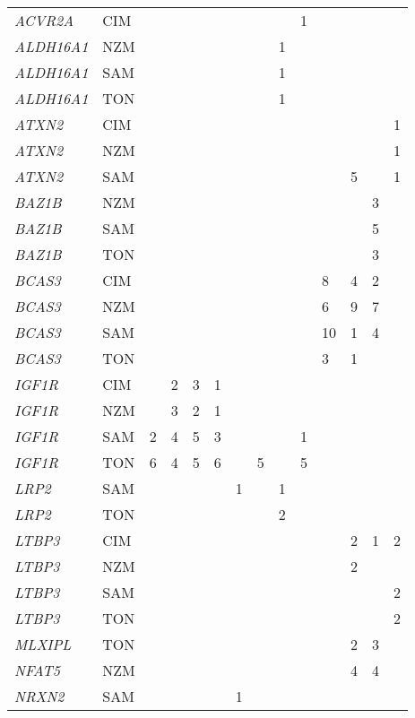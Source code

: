 \documentclass[twoside,openright]{report}
\begin{document}
\begin{ThreePartTable}
\begin{longtable}[t]{llllllllllllll}
\em{ACVR2A} & CIM &  &  &  &  &  &  &  & 1 &  &  &  & \\
\em{ALDH16A1} & NZM &  &  &  &  &  &  & 1 &  &  &  &  & \\
\em{ALDH16A1} & SAM &  &  &  &  &  &  & 1 &  &  &  &  & \\
\em{ALDH16A1} & TON &  &  &  &  &  &  & 1 &  &  &  &  & \\
\em{ATXN2} & CIM &  &  &  &  &  &  &  &  &  &  &  & 1\\
\em{ATXN2} & NZM &  &  &  &  &  &  &  &  &  &  &  & 1\\
\em{ATXN2} & SAM &  &  &  &  &  &  &  &  &  & 5 &  & 1\\
\em{BAZ1B} & NZM &  &  &  &  &  &  &  &  &  &  & 3 & \\
\em{BAZ1B} & SAM &  &  &  &  &  &  &  &  &  &  & 5 & \\
\em{BAZ1B} & TON &  &  &  &  &  &  &  &  &  &  & 3 & \\
\em{BCAS3} & CIM &  &  &  &  &  &  &  &  & 8 & 4 & 2 & \\
\em{BCAS3} & NZM &  &  &  &  &  &  &  &  & 6 & 9 & 7 & \\
\em{BCAS3} & SAM &  &  &  &  &  &  &  &  & 10 & 1 & 4 & \\
\em{BCAS3} & TON &  &  &  &  &  &  &  &  & 3 & 1 &  & \\
\em{IGF1R} & CIM &  & 2 & 3 & 1 &  &  &  &  &  &  &  & \\
\em{IGF1R} & NZM &  & 3 & 2 & 1 &  &  &  &  &  &  &  & \\
\em{IGF1R} & SAM & 2 & 4 & 5 & 3 &  &  &  & 1 &  &  &  & \\
\em{IGF1R} & TON & 6 & 4 & 5 & 6 &  & 5 &  & 5 &  &  &  & \\
\em{LRP2} & SAM &  &  &  &  & 1 &  & 1 &  &  &  &  & \\
\em{LRP2} & TON &  &  &  &  &  &  & 2 &  &  &  &  & \\
\em{LTBP3} & CIM &  &  &  &  &  &  &  &  &  & 2 & 1 & 2\\
\em{LTBP3} & NZM &  &  &  &  &  &  &  &  &  & 2 &  & \\
\em{LTBP3} & SAM &  &  &  &  &  &  &  &  &  &  &  & 2\\
\em{LTBP3} & TON &  &  &  &  &  &  &  &  &  &  &  & 2\\
\em{MLXIPL} & TON &  &  &  &  &  &  &  &  &  & 2 & 3 & \\
\em{NFAT5} & NZM &  &  &  &  &  &  &  &  &  & 4 & 4 & \\
\em{NRXN2} & SAM &  &  &  &  & 1 &  &  &  &  &  &  & \\

\end{longtable}
\end{ThreePartTable}
\end{document}
